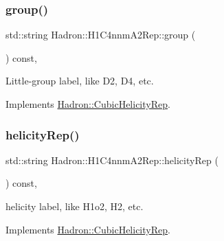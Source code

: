 \mbox{\label{structHadron_1_1H1C4nnmA2Rep_a618b727c856720ba9e2828e3485f6733}} 
\subsubsection{\texorpdfstring{group()}{group()}\hspace{0.1cm}{\footnotesize\ttfamily [5/5]}}
{\footnotesize\ttfamily std\+::string Hadron\+::\+H1\+C4nnm\+A2\+Rep\+::group (\begin{DoxyParamCaption}{ }\end{DoxyParamCaption}) const\hspace{0.3cm}{\ttfamily [inline]}, {\ttfamily [virtual]}}

Little-\/group label, like D2, D4, etc. 

Implements \mbox{\hyperlink{structHadron_1_1CubicHelicityRep_a101a7d76cd8ccdad0f272db44b766113}{Hadron\+::\+Cubic\+Helicity\+Rep}}.

\mbox{\label{structHadron_1_1H1C4nnmA2Rep_abbeab2e3b048d09ea64582a68a2180a5}} 
\subsubsection{\texorpdfstring{helicityRep()}{helicityRep()}\hspace{0.1cm}{\footnotesize\ttfamily [1/3]}}
{\footnotesize\ttfamily std\+::string Hadron\+::\+H1\+C4nnm\+A2\+Rep\+::helicity\+Rep (\begin{DoxyParamCaption}{ }\end{DoxyParamCaption}) const\hspace{0.3cm}{\ttfamily [inline]}, {\ttfamily [virtual]}}

helicity label, like H1o2, H2, etc. 

Implements \mbox{\hyperlink{structHadron_1_1CubicHelicityRep_af1096946b7470edf0a55451cc662f231}{Hadron\+::\+Cubic\+Helicity\+Rep}}.

\mbox{\label{structHadron_1_1H1C4nnmA2Rep_abbeab2e3b048d09ea64582a68a2180a5}} 
